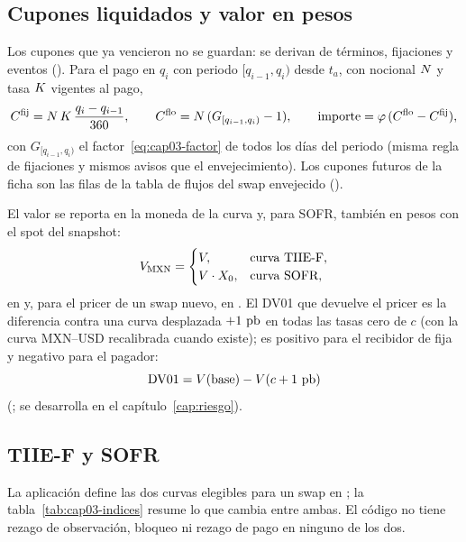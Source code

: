 \subsection{Cupones liquidados y valor en pesos}\label{sec:cap03-liquidados}

Los cupones que ya vencieron no se guardan: se derivan de términos, fijaciones y eventos
(). Para el pago en $q_i$ con periodo $[q_{i-1},q_i)$ desde
$t_a$, con nocional $N$ y tasa $K$ vigentes al pago,
\begin{equation}\label{eq:cap03-liquidado}
  C^{\mathrm{fij}}=N\,K\,\frac{q_i-q_{i-1}}{360},\qquad
  C^{\mathrm{flo}}=N\,(G_{[q_{i-1},q_i)}-1),\qquad
  \text{importe}=\varphi\,(C^{\mathrm{flo}}-C^{\mathrm{fij}}),
\end{equation}
con $G_{[q_{i-1},q_i)}$ el factor~\eqref{eq:cap03-factor} de todos los días del periodo (misma regla de
fijaciones y mismos avisos que el envejecimiento). Los cupones futuros de la ficha son las filas de la tabla
de flujos del swap envejecido ().

El valor se reporta en la moneda de la curva y, para SOFR, también en pesos con el spot del snapshot:
\begin{equation}\label{eq:cap03-pv-mxn}
  V_{\textup{MXN}}=\begin{cases}V, & \text{curva TIIE-F},\\ V\cdot X_0, & \text{curva SOFR},\end{cases}
\end{equation}
en  y, para el pricer de un swap nuevo, en
. El DV01 que devuelve el pricer es la diferencia contra una curva
desplazada $+1~\textup{pb}$ en todas las tasas cero de $c$ (con la curva MXN--USD recalibrada cuando existe); es
positivo para el recibidor de fija y negativo para el pagador:
\begin{equation}\label{eq:cap03-dv01}
  \mathrm{DV01}=V(\text{base})-V(c+1~\textup{pb})
\end{equation}
(; se desarrolla en el capítulo~\ref{cap:riesgo}).

\subsection{TIIE-F y SOFR}\label{sec:cap03-indices}

La aplicación define las dos curvas elegibles para un swap en ; la
tabla~\ref{tab:cap03-indices} resume lo que cambia entre ambas. El código no tiene rezago de observación,
bloqueo ni rezago de pago en ninguno de los dos.

